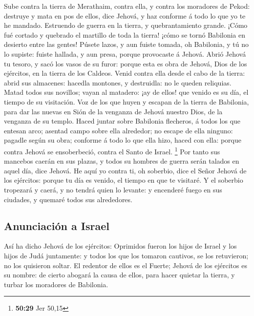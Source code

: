  Sube contra la tierra de Merathaim, contra ella, y contra
los moradores de Pekod: destruye y mata en pos de ellos, dice Jehová, y
haz conforme á todo lo que yo te he mandado.  Estruendo de
guerra en la tierra, y quebrantamiento grande.  ¡Cómo fué
cortado y quebrado el martillo de toda la tierra! ¡cómo se tornó
Babilonia en desierto entre las gentes!  Púsete lazos, y
aun fuiste tomada, oh Babilonia, y tú no lo supiste: fuiste hallada, y
aun presa, porque provocaste á Jehová.  Abrió Jehová tu
tesoro, y sacó los vasos de su furor: porque esta es obra de Jehová,
Dios de los ejércitos, en la tierra de los Caldeos.  Venid
contra ella desde el cabo de la tierra: abrid sus almacenes: hacedla
montones, y destruidla: no le queden reliquias.  Matad
todos sus novillos; vayan al matadero: ¡ay de ellos! que venido es su
día, el tiempo de su visitación.  Voz de los que huyen y
escapan de la tierra de Babilonia, para dar las nuevas en Sión de la
venganza de Jehová nuestro Dios, de la venganza de su templo.
 Haced juntar sobre Babilonia flecheros, á todos los que
entesan arco; asentad campo sobre ella alrededor; no escape de ella
ninguno: pagadle según su obra; conforme á todo lo que ella hizo, haced
con ella: porque contra Jehová se ensoberbeció, contra el Santo de
Israel. \footnote{\textbf{50:29} Jer 50,15}  Por tanto sus
mancebos caerán en sus plazas, y todos su hombres de guerra serán
talados en aquel día, dice Jehová.  He aquí yo contra ti,
oh soberbio, dice el Señor Jehová de los ejércitos: porque tu día es
venido, el tiempo en que te visitaré.  Y el soberbio
tropezará y caerá, y no tendrá quien lo levante: y encenderé fuego en
sus ciudades, y quemaré todos sus alrededores.

\hypertarget{anunciaciuxf3n-a-israel}{%
\subsection{Anunciación a Israel}\label{anunciaciuxf3n-a-israel}}

 Así ha dicho Jehová de los ejércitos: Oprimidos fueron los
hijos de Israel y los hijos de Judá juntamente: y todos los que los
tomaron cautivos, se los retuvieron; no los quisieron soltar.
 El redentor de ellos es el Fuerte; Jehová de los ejércitos
es su nombre: de cierto abogará la causa de ellos, para hacer quietar la
tierra, y turbar los moradores de Babilonia.

